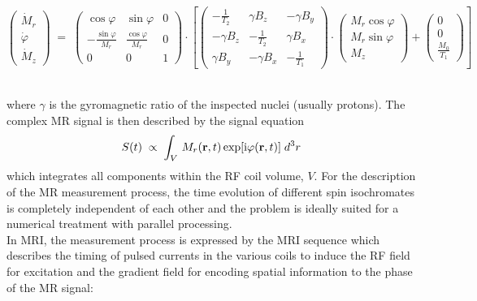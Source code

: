 \documentclass{nic-series}
\begin{document}
\begin{small}
\begin{equation}\label{eq:bloch}
 \left ( \begin{array}{c} \dot{M}_r \\ \dot{\varphi} \\ \dot{M}_z \end{array} \right ) \;=\;
 \left ( \begin{array}{ccc}
 \cos\varphi & \sin\varphi & 0 \\ -\frac{\sin\varphi}{M_r} & \frac{\cos\varphi}{M_r} & 0 \\ 0 & 0 & 1
 \end{array} \right )\cdot
 \left [
 \left ( \begin{array}{ccc} -\frac{1}{T_2} & \gamma B_z & -\gamma B_y \\
                             -\gamma B_z &-\frac{1}{T_2} &  \gamma B_x \\
                             \gamma B_y & -\gamma B_x &-\frac{1}{T_1}
          \end{array} \right )
 \cdot \left ( \begin{array}{c} {M}_r\cos\varphi \\ {M}_r\sin\varphi \\ {M}_z \end{array} \right )
 + \left ( \begin{array}{c} 0 \\ 0 \\ \frac{M_0}{T_1} \end{array} \right ) \right ]
\end{equation}
\end{small}
\ \\
where $\gamma$ is the gyromagnetic ratio of the inspected nuclei (usually protons). The complex MR signal is then described by the signal equation
\begin{equation}\label{eq:signal}
 S(t)\;\propto\;\int_{V}\,M_r({\bf r},t)\exp[\mbox{i}\varphi({\bf r},t)]\;d^{3}r
\end{equation}
which integrates all components within the RF coil volume, $V$. For the description of the MR measurement process, the time
evolution of different spin isochromates is completely independent of each other and  the problem is ideally suited for a numerical treatment with
parallel processing. \\ In MRI, the measurement process is expressed by the MRI sequence \cite{haacke} which describes the timing of pulsed currents
in the various coils to induce the RF field for excitation and the gradient field for encoding spatial information to the phase of the MR signal: 
\end{document}
